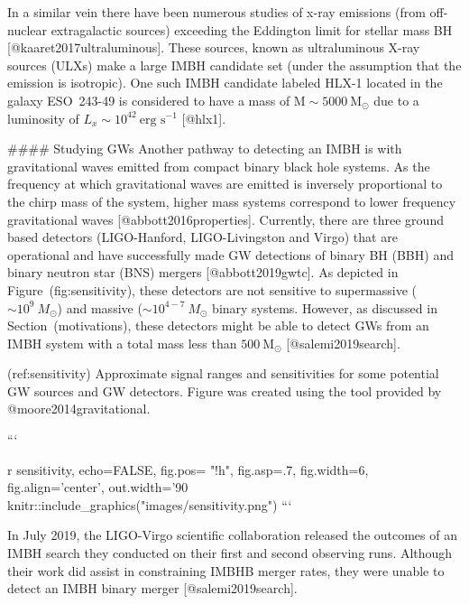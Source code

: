 {{{{{{In a similar vein there have been numerous studies of x-ray emissions
(from off-nuclear extragalactic sources) exceeding the Eddington limit
for stellar mass BH [@kaaret2017ultraluminous]. These sources, known as
ultraluminous X-ray sources (ULXs) make a large IMBH candidate set
(under the assumption that the emission is isotropic). One such IMBH
candidate labeled HLX-1 located in the galaxy ESO~243-49 is considered
to have a mass of $\text{M}\sim5000\ \text{M}_{\odot}$ due to a luminosity of
$L_x\sim10^{42}\ \text{erg s}^{-1}$ [@hlx1].

#### Studying GWs
Another pathway to detecting an IMBH is with gravitational waves emitted
from compact binary black hole systems. As the frequency at which
gravitational waves are emitted is inversely proportional to the chirp
mass of the system, higher mass systems correspond to lower frequency
gravitational waves [@abbott2016properties]. Currently, there are three
ground based detectors (LIGO-Hanford, LIGO-Livingston and Virgo) that
are operational and have successfully made GW detections of binary BH
(BBH) and binary neutron star (BNS) mergers [@abbott2019gwtc]. As
depicted in Figure~\@ref(fig:sensitivity), these detectors are not
sensitive to supermassive ($\sim10^9\ M_{\odot}$) and massive
($\sim10^{4-7}\ M_{\odot}$ binary systems. However, as discussed
in Section~\@ref(motivations), these detectors might be able to detect
GWs from an IMBH system with a total mass less than $500\
\text{M}_{\odot}$ [@salemi2019search].


(ref:sensitivity) Approximate signal ranges and sensitivities for some potential GW sources and GW detectors. Figure was created using the tool provided by @moore2014gravitational.

```{r sensitivity, echo=FALSE, fig.pos= "!h", fig.asp=.7, fig.width=6, fig.align='center', out.width='90%
knitr::include_graphics("images/sensitivity.png")
```

In July 2019, the LIGO-Virgo scientific collaboration released the
outcomes of an IMBH search they conducted on their first and second
observing runs. Although their work did assist in constraining IMBHB
merger rates, they were unable to detect an IMBH binary merger
[@salemi2019search].

}}}}}}}
